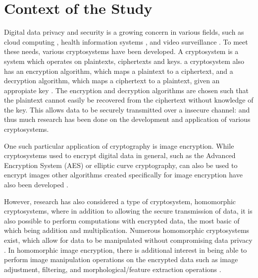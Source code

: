 
\section{Context of the Study}

Digital data privacy and security is a growing concern in various fields, such as  cloud computing \cite{potey_homomorphic_2016}, health information systems \cite{kester_cryptographic_2015}, and video surveillance \cite{upmanyu_efficient_2009}. To meet these needs, various cryptosystems have been developed. A cryptosystem is a system which operates on plaintexts, ciphertexts and keys. a cryptosystem also has an encryption algorithm, which maps a plaintext to a ciphertext, and a decryption algorithm, which maps a ciphertext to a plaintext, given an appropiate key \cite[p.119]{tilborg_encyclopedia_2005}. The encryption and decryption algorithms are chosen such that the plaintext cannot easily be recovered from the ciphertext without knowledge of the key. This allows data to be securely transmitted over a insecure channel:  and thus much research has been done on the development and application of various cryptosystems.

One such particular application of cryptography is image encryption. While cryptosystems used to encrypt digital data in general, such as the Advanced Encryption System (AES) or elliptic curve cryptography, can also be used to encrypt images \cite{jain_image_2016, singh_image_2015} other algorithms created specifically for image encryption have also been developed \cite{murugan_survey_2018}.

However, research has also considered a type of cryptosystem, homomorphic cryptosystems, where in addition to allowing the secure transmission of data, it is also possible to perform computations with encrypted data, the most basic of which being addition and multiplication. Numerous homomorphic cryptosystems exist, which allow for data to be manipulated without compromising data privacy \cite{fontaine_survey_2007, sen_homomorphic_2013}. In homomorphic image encryption, there is additional interest in being able to perform image manipulation operations on the encrypted data such as image adjustment, filtering, and morphological/feature extraction operations \cite{ziad_cryptoimg:_2016, gonzalez_digital_2008}.
